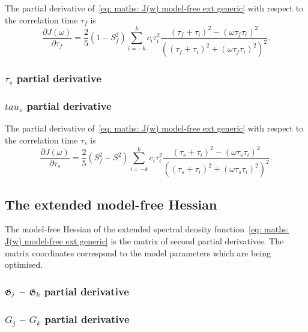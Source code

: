 The partial derivative of~\eqref{eq: maths: J(w) model-free ext generic} with respect to the correlation time $\tau_f$ is
\begin{equation}
    \frac{\partial J(\omega)}{\partial \tau_f} = \frac{2}{5} (1 - S^2_f) \sum_{i=-k}^k c_i \tau_i^2
        \frac{(\tau_f + \tau_i)^2 - (\omega \tau_f \tau_i)^2}{\left((\tau_f + \tau_i)^2 + (\omega \tau_f \tau_i)^2 \right)^2}.
\end{equation}



\begin{latexonly}
    \subsubsection{$\tau_s$ partial derivative}
\end{latexonly}
\begin{htmlonly}
    \subsubsection{$tau_s$ partial derivative}
\end{htmlonly}

The partial derivative of~\eqref{eq: maths: J(w) model-free ext generic} with respect to the correlation time $\tau_s$ is
\begin{equation}
    \frac{\partial J(\omega)}{\partial \tau_s} = \frac{2}{5} (S^2_f - S^2) \sum_{i=-k}^k c_i \tau_i^2
        \frac{(\tau_s + \tau_i)^2 - (\omega \tau_s \tau_i)^2}{\left((\tau_s + \tau_i)^2 + (\omega \tau_s \tau_i)^2 \right)^2}.
\end{equation}





\newpage
\subsection{The extended model-free Hessian}

The model-free Hessian of the extended spectral density function~\eqref{eq: maths: J(w) model-free ext generic} is the matrix of second partial derivatives.
The matrix coordinates correspond to the model parameters which are being optimised.



\begin{latexonly}
    \subsubsection{$\mathfrak{G}_j$ -- $\mathfrak{G}_k$ partial derivative}
\end{latexonly}
\begin{htmlonly}
    \subsubsection{$G_j$ -- $G_k$ partial derivative}
\end{htmlonly}

